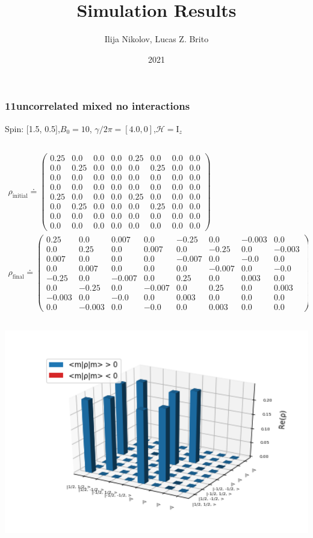 \documentclass[10pt]{beamer}
\title{Simulation Results}
\author{Ilija Nikolov, Lucas Z. Brito}
\institute{}
\date{2021}
\begin{document}
\frame{\titlepage}
\begin{frame}
\frametitle{11uncorrelated mixed no interactions}
Spin: [1.5, 0.5],$B_0= 10$, $\gamma/2\pi = [4.0, 0]$,$\mathcal{H}=\text{I}_{z}$
\begin{columns}[T]
\begin{column}{.5\textwidth}
\tiny\begin{align*}
\rho_{\text{initial}}\doteq
\begin{pmatrix}
0.25 & 0.0 & 0.0 & 0.0 & 0.25 & 0.0 & 0.0 & 0.0 \\
0.0 & 0.25 & 0.0 & 0.0 & 0.0 & 0.25 & 0.0 & 0.0 \\
0.0 & 0.0 & 0.0 & 0.0 & 0.0 & 0.0 & 0.0 & 0.0 \\
0.0 & 0.0 & 0.0 & 0.0 & 0.0 & 0.0 & 0.0 & 0.0 \\
0.25 & 0.0 & 0.0 & 0.0 & 0.25 & 0.0 & 0.0 & 0.0 \\
0.0 & 0.25 & 0.0 & 0.0 & 0.0 & 0.25 & 0.0 & 0.0 \\
0.0 & 0.0 & 0.0 & 0.0 & 0.0 & 0.0 & 0.0 & 0.0 \\
0.0 & 0.0 & 0.0 & 0.0 & 0.0 & 0.0 & 0.0 & 0.0
\end{pmatrix}
\\
\rho_{\text{final}}\doteq
\begin{pmatrix}
0.25 & 0.0 & 0.007 & 0.0 & -0.25 & 0.0 & -0.003 & 0.0 \\
0.0 & 0.25 & 0.0 & 0.007 & 0.0 & -0.25 & 0.0 & -0.003 \\
0.007 & 0.0 & 0.0 & 0.0 & -0.007 & 0.0 & -0.0 & 0.0 \\
0.0 & 0.007 & 0.0 & 0.0 & 0.0 & -0.007 & 0.0 & -0.0 \\
-0.25 & 0.0 & -0.007 & 0.0 & 0.25 & 0.0 & 0.003 & 0.0 \\
0.0 & -0.25 & 0.0 & -0.007 & 0.0 & 0.25 & 0.0 & 0.003 \\
-0.003 & 0.0 & -0.0 & 0.0 & 0.003 & 0.0 & 0.0 & 0.0 \\
0.0 & -0.003 & 0.0 & -0.0 & 0.0 & 0.003 & 0.0 & 0.0
\end{pmatrix}
\end{align*}
\begin{column}{.5\textwidth}
\includegraphics[width=1.3\textwidth]{./test/11uncorrelated_mixed_no_interactions/InitialRealPartDensityMatrix.png}

\end{column}
\end{column}
\end{columns}
\end{frame}
\end{document}
